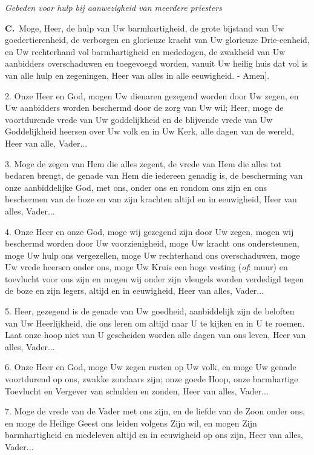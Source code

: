 \documentclass[12pt,twoside,a5paper]{article}
\newlength{\origparskip}
\newenvironment{halfparskip}{
  \setlength{\parskip}{0.5\origparskip}
}{
  \setlength{\parskip}{\origparskip}
}
\newcommand{\cc}{{\color{BrickRed} \textbf{C.}}}
\newcommand{\liturgicalhint}[1]{{\color{BrickRed}\footnotesize\itshape{#1}}}
\begin{document}
\begin{halfparskip}
  \liturgicalhint{Gebeden voor hulp bij aanwezigheid van meerdere priesters}

  \cc\ Moge, Heer, de hulp van Uw barmhartigheid, de grote bijstand van Uw goedertierenheid, de verborgen en glorieuze kracht van Uw glorieuze Drie-eenheid, en Uw rechterhand vol barmhartigheid en mededogen, de zwakheid van Uw aanbidders overschaduwen en toegevoegd worden, vanuit Uw heilig huis dat vol is van alle hulp en zegeningen, Heer van alles in alle eeuwigheid. - Amen].

  2. Onze Heer en God, mogen Uw dienaren gezegend worden door Uw zegen, en Uw aanbidders worden beschermd door de zorg van Uw wil; Heer, moge de voortdurende vrede van Uw goddelijkheid en de blijvende vrede van Uw Goddelijkheid heersen over Uw volk en in Uw Kerk, alle dagen van de wereld, Heer van alle, Vader...

  3. Moge de zegen van Hem die alles zegent, de vrede van Hem die alles tot bedaren brengt, de genade van Hem die iedereen genadig is, de bescherming van onze aanbiddelijke God, met ons, onder ons en rondom ons zijn en ons beschermen van de boze en van zijn krachten altijd en in eeuwigheid, Heer van alles, Vader...

  4. Onze Heer en onze God, moge wij gezegend zijn door Uw zegen, mogen wij beschermd worden door Uw voorzienigheid, moge Uw kracht ons ondersteunen, moge Uw hulp ons vergezellen, moge Uw rechterhand ons overschaduwen, moge Uw vrede heersen onder ons, moge Uw Kruis een hoge vesting (\emph{of}: muur) en toevlucht voor ons zijn en mogen wij onder zijn vleugels worden verdedigd tegen de boze en zijn legers, altijd en in eeuwigheid, Heer van alles, Vader...

  5. Heer, gezegend is de genade van Uw goedheid, aanbiddelijk zijn de beloften van Uw Heerlijkheid, die ons leren om altijd naar U te kijken en in U te roemen. Laat onze hoop niet van U gescheiden worden alle dagen van ons leven, Heer van alles, Vader...

  6. Onze Heer en God, moge Uw zegen rusten op Uw volk, en moge Uw genade voortdurend op ons, zwakke zondaars zijn; onze goede Hoop, onze barmhartige Toevlucht en Vergever van schulden en zonden, Heer van alles, Vader...

  7. Moge de vrede van de Vader met ons zijn, en de liefde van de Zoon onder ons, en moge de Heilige Geest ons leiden volgens Zijn wil, en mogen Zijn barmhartigheid en medeleven altijd en in eeuwigheid op ons zijn, Heer van alles, Vader...


\end{halfparskip}
\end{document}
